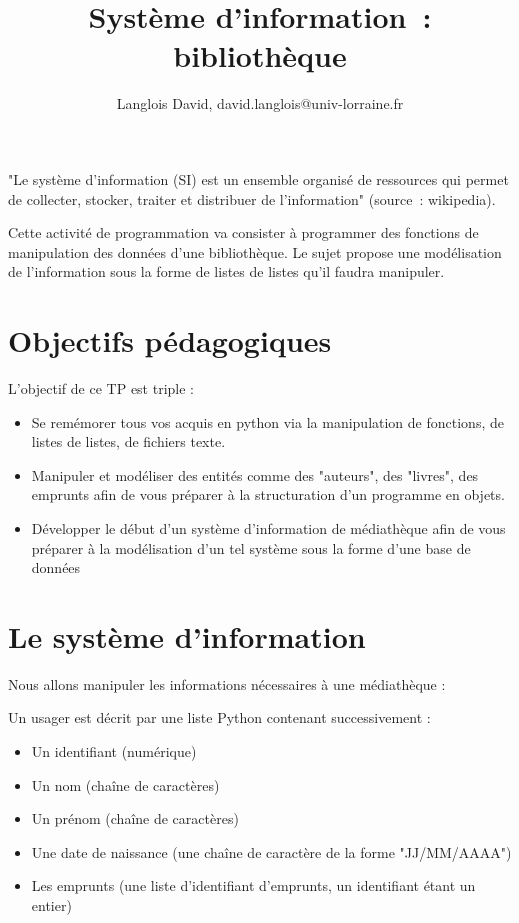\documentclass[10pt,a4paper,onecolumn]{article}
\begin{document}
\title{Système d'information~: bibliothèque}

\author{Langlois David, david.langlois@univ-lorraine.fr}

\maketitle

"Le système d'information (SI) est un ensemble organisé de ressources qui permet de collecter, stocker, traiter et distribuer de l'information" (source~: wikipedia).

Cette activité de programmation va consister à programmer des fonctions de manipulation des données d'une bibliothèque. Le sujet propose une modélisation de l'information sous la forme de listes de listes qu'il faudra manipuler.

\section{Objectifs pédagogiques}

L'objectif de ce TP est triple :

\begin{itemize}
\item Se remémorer tous vos acquis en python via la manipulation de fonctions, de listes de listes, de fichiers texte.
\item Manipuler et modéliser des entités comme des "auteurs", des "livres", des emprunts afin de vous préparer à la structuration d'un programme en objets.
\item Développer le début d'un système d'information de médiathèque afin de vous préparer à la modélisation d'un tel système sous la forme d'une base de données
\end{itemize}

\section{Le système d'information}

Nous allons manipuler les informations nécessaires à une médiathèque :

Un usager est décrit par une liste Python contenant successivement : 

\begin{itemize}
\item Un identifiant (numérique)
\item Un nom (chaîne de caractères)
\item Un prénom (chaîne de caractères)
\item Une date de naissance (une chaîne de caractère de la forme "JJ/MM/AAAA")
\item Les emprunts (une liste d'identifiant d'emprunts, un identifiant étant un entier)
\end{itemize}
\end{document}
